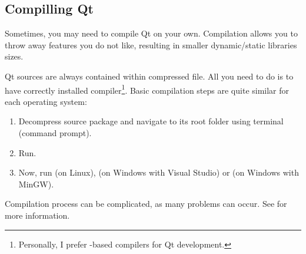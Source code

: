 \subsection{Compilling Qt}
Sometimes, you may need to compile Qt on your own. Compilation allows you to throw away features you do not like, resulting in smaller dynamic/static libraries sizes.

Qt sources are always contained within compressed file. All you need to do is to have correctly installed \cpp{} compiler\footnote{Personally, I prefer -based compilers for Qt development.}. Basic compilation steps are quite similar for each operating system:
\begin{enumerate}
\item Decompress source package and navigate to its root folder using terminal (command prompt).
\item Run.
\item Now, run (on Linux), (on Windows with Visual Studio) or (on Windows with MinGW).
\end{enumerate}

Compilation process can be complicated, as many problems can occur. See \citep{various:qtdoc} for more information.